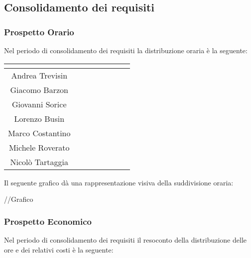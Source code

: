 \subsection{Consolidamento dei requisiti}

\subsubsection{Prospetto Orario}
Nel periodo di consolidamento dei requisiti la distribuzione oraria è la seguente:

\begin{center}
\renewcommand{\arraystretch}{1.5}
\begin{tabular}{|c|c|c|c|c|c|c|c|}
\hline
\rowcolor{title_row}
\textbf{\color{title_text}{Nome}} & \textbf{\color{title_text}{Resp.}} & \textbf{\color{title_text}{Ammi.}} & \textbf{\color{title_text}{Analist.}} & \textbf{\color{title_text}{Progett.}} & \textbf{\color{title_text}{Program.}} & \textbf{\color{title_text}{Verific.}} & \textbf{\color{title_text}{Totale}} \\ \hline
Andrea Trevisin  & & & & & & &  \\ \hline
Giacomo Barzon   & & & & & & &  \\ \hline
Giovanni Sorice  & & & & & & &  \\ \hline
Lorenzo Busin    & & & & & & &  \\ \hline
Marco Costantino & & & & & & &  \\ \hline
Michele Roverato & & & & & & &  \\ \hline
Nicolò Tartaggia & & & & & & &  \\ \hline
\end{tabular}
\renewcommand{\arraystretch}{1}
\end{center}

Il seguente grafico dà una rappresentazione visiva della suddivisione oraria: \\
\begin{center}
//Grafico
\end{center}


\subsubsection{Prospetto Economico}
Nel periodo di consolidamento dei requisiti il resoconto della distribuzione delle ore e dei relativi costi è la seguente:

